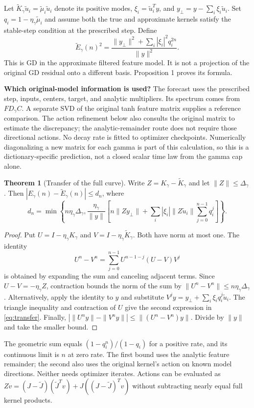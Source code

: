 \documentclass[11pt]{article}
\theoremstyle{definition}
\newtheorem{theorem}{Theorem}
\begin{document}
Let
$\widetilde K_\gamma\widetilde u_i=\widetilde\mu_i\widetilde u_i$ denote
its positive modes, $\xi_i=\widetilde u_i^Ty$, and
$y_\perp=y-\sum_i\xi_i\widetilde u_i$. Set
$q_i=1-\eta_\gamma\widetilde\mu_i$ and assume both the true and approximate
kernels satisfy the stable-step condition at the prescribed step. Define
\begin{equation}\label{eq:approxcurve}
 \widetilde E_\gamma(n)^2=
 \frac{\|y_\perp\|^2+\sum_i|\xi_i|^2q_i^{2n}}{\|y\|^2}.
\end{equation}
This is GD in the approximate filtered feature model. It is not a projection
of the original GD residual onto a different basis. Proposition 1 proves its formula.

\textbf{Which original-model information is used?}
The forecast uses the prescribed step, inputs, centers, target, and analytic
multipliers. Its spectrum comes from $FD_\gamma C$. A separate SVD of the
original tanh feature matrix supplies a reference comparison. The action
refinement below also consults the original matrix to estimate the discrepancy;
the analytic-remainder route does not require those directional actions.
No decay rate is fitted to optimizer checkpoints. Numerically diagonalizing a
new matrix for each gamma is part of this calculation, so this is a
dictionary-specific prediction, not a closed scalar time law from the gamma
cap alone.

\begin{theorem}[Transfer of the full curve]
Write $Z=K_\gamma-\widetilde K_\gamma$ and let $\|Z\|\le\Delta_\gamma$.
Then $|E_\gamma(n)-\widetilde E_\gamma(n)|\le d_n$, where
\begin{equation}\label{eq:transfer}
 d_n=\min\left\{n\eta_\gamma\Delta_\gamma,
 \frac{\eta_\gamma}{\|y\|}
 \left[n\|Zy_\perp\|+
 \sum_i|\xi_i|\|Z\widetilde u_i\|\sum_{j=0}^{n-1}q_i^j\right]\right\}.
\end{equation}
\end{theorem}
\begin{proof}
Put $U=I-\eta_\gamma K_\gamma$ and $V=I-\eta_\gamma\widetilde K_\gamma$.
Both have norm at most one. The identity
\begin{equation*}
 U^n-V^n=\sum_{j=0}^{n-1}U^{n-1-j}(U-V)V^j
\end{equation*}
is obtained by expanding the sum and canceling adjacent terms. Since
$U-V=-\eta_\gamma Z$, contraction bounds the norm of the sum by
$\|U^n-V^n\|\le n\eta_\gamma\Delta_\gamma$.
Alternatively, apply the identity to $y$ and substitute
$V^jy=y_\perp+\sum_i\xi_iq_i^j\widetilde u_i$. The triangle inequality
and contraction of $U$ give the second expression in \eqref{eq:transfer}.
Finally, $|\|U^ny\|-\|V^ny\||\le\|(U^n-V^n)y\|$. Divide by $\|y\|$ and
take the smaller bound.
\end{proof}
The geometric sum equals $(1-q_i^n)/(1-q_i)$ for a positive rate, and its
continuous limit is $n$ at zero rate. The first bound uses the analytic
feature remainder; the second also uses the original kernel's action on
known model directions. Neither needs optimizer iterates. Actions can be
evaluated as
$Zv=(J-\widetilde J)(\widetilde J^Tv)+J((J-\widetilde J)^Tv)$ without
subtracting nearly equal full kernel products.
\end{document}
